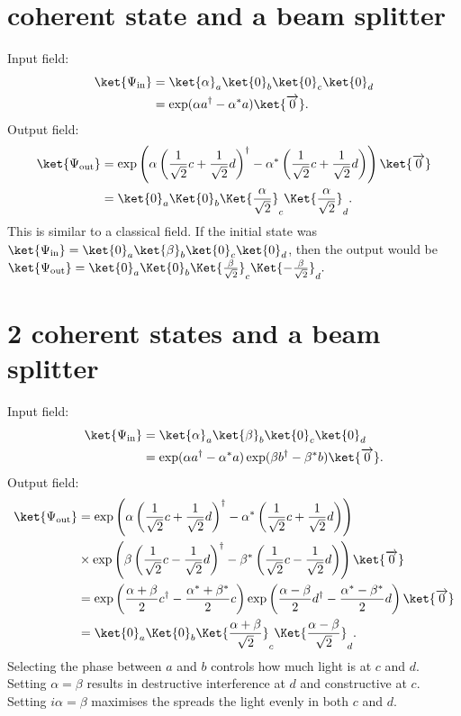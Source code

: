 \section{coherent state and a beam splitter}
Input field:
\begin{align}
\ket{\Psi_{\rm{in}}} &= \ket{\alpha}_a\ket{0}_b\ket{0}_c\ket{0}_d \\
&= \exp(\alpha a^\dagger - \alpha^*a)\ket{\overrightarrow{0}}.
\end{align}
Output field:
\begin{align}
\ket{\Psi_{\rm{out}}} &= \exp\left(\alpha \left(\frac{1}{\sqrt{2}}c + \frac{1}{\sqrt{2}}d\right)^\dagger - \alpha^*\left(\frac{1}{\sqrt{2}}c + \frac{1}{\sqrt{2}}d\right)\right)\ket{\overrightarrow{0}}\\
&= \ket{0}_a\Ket{0}_b\Ket{\frac{\alpha}{\sqrt{2}}}_c\Ket{\frac{\alpha}{\sqrt{2}}}_d.
\end{align}
This is similar to a classical field. If the initial state was $ \ket{\Psi_{\rm{in}}} =  \ket{0}_a\ket{\beta}_b\ket{0}_c\ket{0}_d $, then the output would be  $\ket{\Psi_{\rm{out}}} = \ket{0}_a\Ket{0}_b\Ket{\frac{\beta}{\sqrt{2}}}_c\Ket{-\frac{\beta}{\sqrt{2}}}_d.$
\section{2 coherent states and a beam splitter}
Input field:
\begin{align}
\ket{\Psi_{\rm{in}}} &= \ket{\alpha}_a\ket{\beta}_b\ket{0}_c\ket{0}_d \\
&= \exp(\alpha a^\dagger - \alpha^*a)\exp(\beta b^\dagger - \beta^*b)\ket{\overrightarrow{0}}.
\end{align}
Output field:
\begin{align}
\ket{\Psi_{\rm{out}}} &= \exp\left(\alpha \left(\frac{1}{\sqrt{2}}c + \frac{1}{\sqrt{2}}d\right)^\dagger - \alpha^*\left(\frac{1}{\sqrt{2}}c + \frac{1}{\sqrt{2}}d\right)\right)\\&\times\exp\left(\beta \left(\frac{1}{\sqrt{2}}c - \frac{1}{\sqrt{2}}d\right)^\dagger - \beta^*\left(\frac{1}{\sqrt{2}}c - \frac{1}{\sqrt{2}}d\right)\right)\ket{\overrightarrow{0}}\\
&= \exp\left( \frac{\alpha + \beta}{2} c^\dagger - \frac{\alpha^* + \beta^*}{2}c\right)\exp\left( \frac{\alpha - \beta}{2} d^\dagger - \frac{\alpha^* - \beta^*}{2}d\right)\ket{\overrightarrow{0}}\\
&= \ket{0}_a\Ket{0}_b\Ket{\frac{\alpha + \beta}{\sqrt{2}}}_c\Ket{\frac{\alpha - \beta}{\sqrt{2}}}_d.
\end{align}
Selecting the phase between $a$ and $b$ controls how much light is at $c$ and $d$. Setting $\alpha = \beta$ results in destructive interference at $d$ and constructive at $c$. Setting $i\alpha = \beta$ maximises the spreads the light evenly in both $c$ and $d$. 
